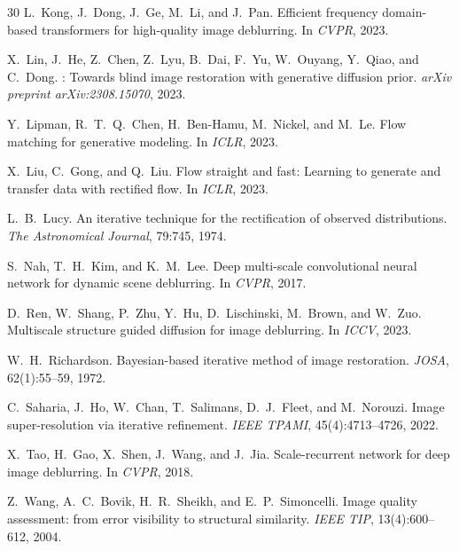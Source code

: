 \documentclass{article}
\begin{document}
\begin{thebibliography}{30}
L.~Kong, J.~Dong, J.~Ge, M.~Li, and J.~Pan.
\newblock Efficient frequency domain-based transformers for high-quality image deblurring.
\newblock In \emph{CVPR}, 2023.

X.~Lin, J.~He, Z.~Chen, Z.~Lyu, B.~Dai, F.~Yu, W.~Ouyang, Y.~Qiao, and C.~Dong.
: Towards blind image restoration with generative diffusion prior.
\newblock \emph{arXiv preprint arXiv:2308.15070}, 2023.

Y.~Lipman, R.~T.~Q.~Chen, H.~Ben-Hamu, M.~Nickel, and M.~Le.
\newblock Flow matching for generative modeling.
\newblock In \emph{ICLR}, 2023.

X.~Liu, C.~Gong, and Q.~Liu.
\newblock Flow straight and fast: Learning to generate and transfer data with rectified flow.
\newblock In \emph{ICLR}, 2023.

L.~B.~Lucy.
\newblock An iterative technique for the rectification of observed distributions.
\newblock \emph{The Astronomical Journal}, 79:745, 1974.

S.~Nah, T.~H.~Kim, and K.~M.~Lee.
\newblock Deep multi-scale convolutional neural network for dynamic scene deblurring.
\newblock In \emph{CVPR}, 2017.

D.~Ren, W.~Shang, P.~Zhu, Y.~Hu, D.~Lischinski, M.~Brown, and W.~Zuo.
\newblock Multiscale structure guided diffusion for image deblurring.
\newblock In \emph{ICCV}, 2023.

W.~H.~Richardson.
\newblock Bayesian-based iterative method of image restoration.
\newblock \emph{JOSA}, 62(1):55--59, 1972.

C.~Saharia, J.~Ho, W.~Chan, T.~Salimans, D.~J.~Fleet, and M.~Norouzi.
\newblock Image super-resolution via iterative refinement.
\newblock \emph{IEEE TPAMI}, 45(4):4713--4726, 2022.

X.~Tao, H.~Gao, X.~Shen, J.~Wang, and J.~Jia.
\newblock Scale-recurrent network for deep image deblurring.
\newblock In \emph{CVPR}, 2018.

Z.~Wang, A.~C.~Bovik, H.~R.~Sheikh, and E.~P.~Simoncelli.
\newblock Image quality assessment: from error visibility to structural similarity.
\newblock \emph{IEEE TIP}, 13(4):600--612, 2004.


\end{thebibliography}
\end{document}
